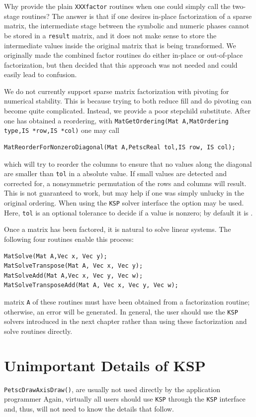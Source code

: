 {{{Why provide the plain \lstinline{XXXfactor} routines when one could simply
call the two-stage routines? The answer is that if one desires in-place
factorization of a sparse matrix, the intermediate stage between the
symbolic and numeric phases cannot be stored in a \lstinline{result} matrix, and
it does not make sense to store the intermediate values
inside the original matrix
that is being transformed.  We originally made the combined factor routines
do either in-place or out-of-place factorization, but then decided that
this approach was not needed and could easily lead to confusion.

We do not currently support sparse matrix factorization with pivoting
for numerical stability. This is because trying to both reduce fill
and do pivoting can become quite complicated. Instead, we provide a
poor stepchild substitute. After one has obtained a reordering, with
\lstinline{MatGetOrdering(Mat A,MatOrdering type,IS *row,IS *col)} one
may call
\begin{lstlisting}
MatReorderForNonzeroDiagonal(Mat A,PetscReal tol,IS row, IS col);
\end{lstlisting}
which will try to reorder the columns to ensure that no values along
the diagonal are smaller than \lstinline{tol} in a absolute value. If small
values are detected and corrected for, a nonsymmetric
permutation of the rows and columns will result. This is not guaranteed to work,
but may help if one was simply unlucky in the original ordering.
When using the \lstinline{KSP} solver interface
the option  
may be used.  Here, \lstinline{tol}
is an optional tolerance to decide if a value is nonzero; by default it
is .

Once a matrix has been factored, it is natural to solve linear systems.
The following four routines enable this process: 
\begin{lstlisting}
MatSolve(Mat A,Vec x, Vec y);
MatSolveTranspose(Mat A, Vec x, Vec y);
MatSolveAdd(Mat A,Vec x, Vec y, Vec w);
MatSolveTransposeAdd(Mat A, Vec x, Vec y, Vec w);
\end{lstlisting}
matrix
\lstinline{A} of these routines must have been obtained from a
factorization routine; otherwise, an error will be generated.
In general, the user should use the \lstinline{KSP} solvers introduced in the
next chapter rather than using these factorization and solve routines
directly.

\section{Unimportant Details of KSP}
\lstinline{PetscDrawAxisDraw()}, are usually
not used directly by the application programmer
Again, virtually all users should use \lstinline{KSP} through the \lstinline{KSP} interface
and, thus, will not need to know the details that follow.

}}}

